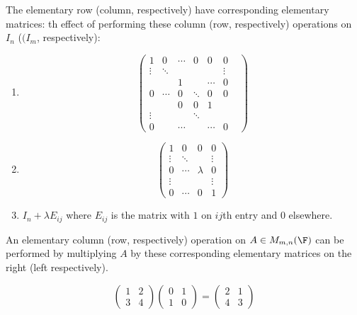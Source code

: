 \documentclass[a4paper]{article}
\theoremstyle{definition}
\begin{document}
\begin{definition}
The elementary row (column, respectively) have corresponding elementary matrices: th effect of performing these column (row, respectively) operations on \(I_n\) (\((I_m\), respectively):
\begin{enumerate}
\item
  \[
    \begin{pmatrix}
      1 & 0 & \cdots & 0 & 0 & 0\\
      \vdots & \ddots & & & & \vdots\\
      & & 1 & & \cdots & 0\\
      0 & \cdots & 0 & \ddots & 0 & 0 \\
      & & 0 & 0 & 1 & &\\
      \vdots & && \ddots& &\\
      0 & & \cdots & & \cdots & 0
    \end{pmatrix}
  \]
\item
  \[
    \begin{pmatrix}
      1 & 0 & 0 & 0 \\
      \vdots & \ddots & & \vdots \\
      0 & \cdots & \lambda & 0 \\
      \vdots & & & \vdots \\
      0 & \cdots & 0 & 1
    \end{pmatrix}
  \]
\item \(I_n+\lambda E_{ij}\) where \(E_{ij}\) is the matrix with \(1\) on \(ij\)th entry and \(0\) elsewhere.
\end{enumerate}
\end{definition}

An elementary column (row, respectively) operation on \(A\in M_{m,n}(\F)\) can be performed by multiplying \(A\) by these corresponding elementary matrices on the right (left respectively).

\begin{eg}
  \[
    \begin{pmatrix}
      1 & 2 \\ 3 & 4
    \end{pmatrix}
    \begin{pmatrix} 0 & 1 \\ 1 & 0 \end{pmatrix} = \begin{pmatrix} 2 & 1 \\ 4 & 3 \end{pmatrix}
  \]
\end{eg}
\end{document}
